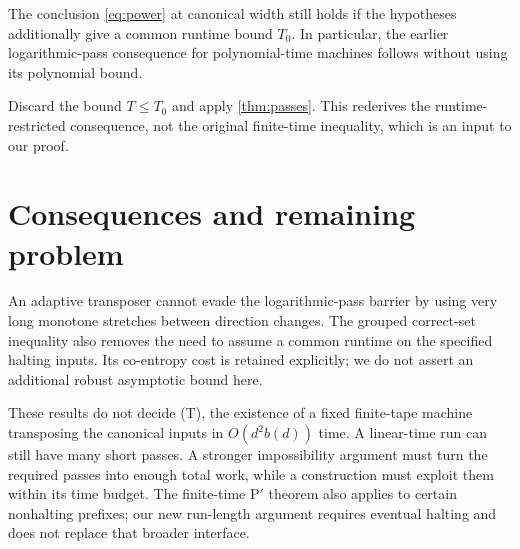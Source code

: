 \begin{corollary}\label{cor:old}
The conclusion \cref{eq:power} at canonical width still holds if the
hypotheses additionally give a common runtime bound $T_0$. In particular,
the earlier logarithmic-pass consequence for polynomial-time machines
follows without using its polynomial bound.
\end{corollary}
\begin{outline}
Discard the bound $T\le T_0$ and apply \cref{thm:passes}. This rederives the
runtime-restricted consequence, not the original finite-time inequality,
which is an input to our proof.
\end{outline}

\section{Consequences and remaining problem}\label{sec:roadmap}
An adaptive transposer cannot evade the logarithmic-pass barrier by using
very long monotone stretches between direction changes. The grouped
correct-set inequality also removes the need to assume a common runtime
on the specified halting inputs. Its co-entropy cost is retained explicitly;
we do not assert an additional robust asymptotic bound here.

These results do not decide (T), the existence of a fixed finite-tape
machine transposing the canonical inputs in $O(d^2b(d))$ time. A linear-time
run can still have many short passes. A stronger impossibility argument
must turn the required passes into enough total work, while a construction
must exploit them within its time budget. The finite-time P$'$ theorem
also applies to certain nonhalting prefixes; our new run-length argument
requires eventual halting and does not replace that broader interface.
